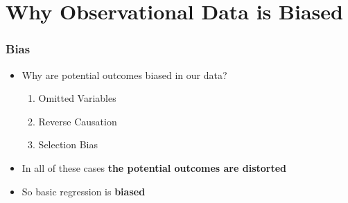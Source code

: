 \documentclass[xcolor=x11names,compress]{beamer}\usepackage[]{graphicx}\usepackage[]{color}
\renewcommand{\(}{\begin{columns}}
\renewcommand{\)}{\end{columns}}
\newcommand{\<}[1]{\begin{column}{#1}}
\renewcommand{\>}{\end{column}}
\begin{document}
\section{Why Observational Data is Biased}

\begin{frame}
\frametitle{Bias}
\begin{itemize}
\item Why are potential outcomes biased in our data?
\pause
\begin{enumerate}
\item Omitted Variables
\pause
\item Reverse Causation
\pause
\item Selection Bias
\pause
\end{enumerate}
\item In all of these cases \textbf{the potential outcomes are distorted}
\pause
\item So basic regression is \textbf{biased}
\end{itemize}
\end{frame}
\end{document}
